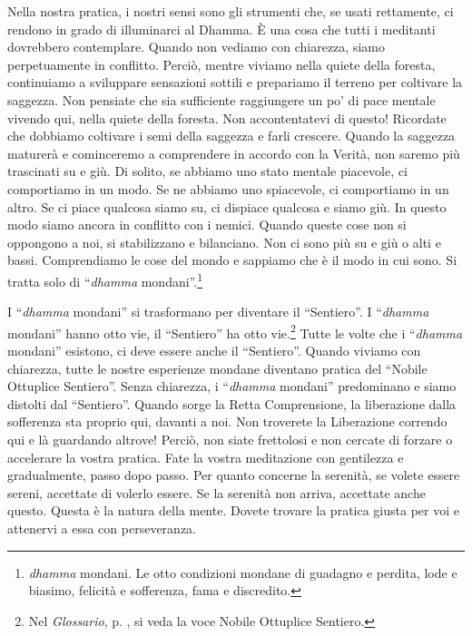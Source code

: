 Nella nostra pratica, i nostri sensi sono gli strumenti che, se usati
rettamente, ci rendono in grado di illuminarci al Dhamma. È una cosa che
tutti i meditanti dovrebbero contemplare. Quando non vediamo con
chiarezza, siamo perpetuamente in conflitto. Perciò, mentre viviamo
nella quiete della foresta, continuiamo a sviluppare sensazioni sottili
e prepariamo il terreno per coltivare la saggezza. Non pensiate che sia
sufficiente raggiungere un po' di pace mentale vivendo qui, nella quiete
della foresta. Non accontentatevi di questo! Ricordate che dobbiamo
coltivare i semi della saggezza e farli crescere. Quando la saggezza
maturerà e cominceremo a comprendere in accordo con la Verità, non
saremo più trascinati su e giù. Di solito, se abbiamo uno stato mentale
piacevole, ci comportiamo in un modo. Se ne abbiamo uno spiacevole, ci
comportiamo in un altro. Se ci piace qualcosa siamo su, ci dispiace
qualcosa e siamo giù. In questo modo siamo ancora in conflitto con i
nemici. Quando queste cose non si oppongono a noi, si stabilizzano e
bilanciano. Non ci sono più su e giù o alti e bassi. Comprendiamo le
cose del mondo e sappiamo che è il modo in cui sono. Si tratta solo di
``\emph{dhamma} mondani''.\footnote{\emph{dhamma} mondani. Le otto
  condizioni mondane di guadagno e perdita, lode e biasimo, felicità e
  sofferenza, fama e discredito.}

I ``\emph{dhamma} mondani'' si trasformano per diventare il
``Sentiero''. I ``\emph{dhamma} mondani'' hanno otto vie, il
``Sentiero'' ha otto vie.\footnote{Nel \emph{Glossario}, p. \pageref{glossary-ottuplice}, si veda la voce
  Nobile Ottuplice Sentiero.} Tutte le volte che i ``\emph{dhamma}
mondani'' esistono, ci deve essere anche il ``Sentiero''. Quando viviamo
con chiarezza, tutte le nostre esperienze mondane diventano pratica del
``Nobile Ottuplice Sentiero''. Senza chiarezza, i ``\emph{dhamma}
mondani'' predominano e siamo distolti dal ``Sentiero''. Quando sorge la
Retta Comprensione, la liberazione dalla sofferenza sta proprio qui,
davanti a noi. Non troverete la Liberazione correndo qui e là guardando
altrove! Perciò, non siate frettolosi e non cercate di forzare o
accelerare la vostra pratica. Fate la vostra meditazione con gentilezza
e gradualmente, passo dopo passo. Per quanto concerne la serenità, se
volete essere sereni, accettate di volerlo essere. Se la serenità non
arriva, accettate anche questo. Questa è la natura della mente. Dovete
trovare la pratica giusta per voi e attenervi a essa con perseveranza.

